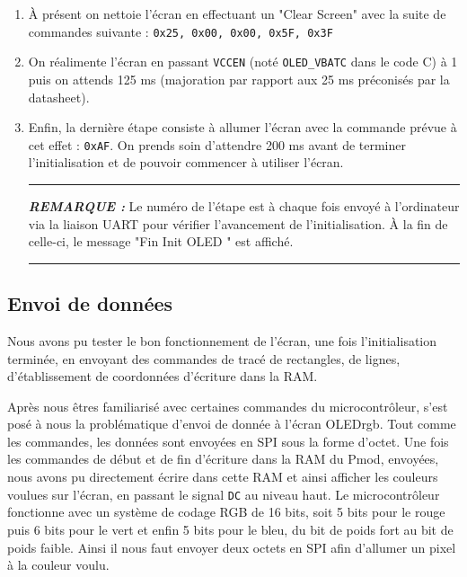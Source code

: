 \documentclass[11pt]{article}
\newcommand{\HRule}{\rule{\linewidth}{0.5mm}}
\newenvironment{rmq}[1] {\noindent\HRule\par\vspace{5pt}\textbf{\textit{REMARQUE : }}#1}{\\\HRule\par\vspace{5pt}}
\begin{document}
\begin{enumerate}
    \item À présent on nettoie l'écran en effectuant un "Clear Screen" avec la suite de commandes suivante : \texttt{0x25, 0x00, 0x00, 0x5F, 0x3F}

    \item On réalimente l'écran en passant \texttt{VCCEN} (noté \texttt{OLED\_VBATC} dans le code C) à 1 puis on attends 125 ms (majoration par rapport aux 25 ms préconisés par la datasheet). 

    \item Enfin, la dernière étape consiste à allumer l'écran avec la commande prévue à cet effet : \texttt{0xAF}. On prends soin d'attendre 200 ms avant de terminer l'initialisation et de pouvoir commencer à utiliser l'écran. 

    \begin{rmq}
    Le numéro de l'étape est à chaque fois envoyé à l'ordinateur via la liaison UART pour vérifier l'avancement de l'initialisation. À la fin de celle-ci, le message "Fin Init OLED " est affiché. 
    \end{rmq}


\end{enumerate}

\newpage

\subsection{Envoi de données}

Nous avons pu tester le bon fonctionnement de l'écran, une fois l'initialisation terminée, en envoyant des commandes de tracé de rectangles, de lignes, d'établissement de coordonnées d'écriture dans la RAM.

Après nous êtres familiarisé avec certaines commandes du microcontrôleur, s'est posé à nous la problématique d'envoi de donnée à l'écran OLEDrgb. Tout comme les commandes, les données sont envoyées en SPI sous la forme d'octet. Une fois les commandes de début et de fin d'écriture dans la RAM du Pmod, envoyées, nous avons pu directement écrire dans cette RAM et ainsi afficher les couleurs voulues sur l'écran, en passant le signal \texttt{DC} au niveau haut. Le microcontrôleur fonctionne avec un système de codage RGB de 16 bits, soit 5 bits pour le rouge puis 6 bits pour le vert et enfin 5 bits pour le bleu, du bit de poids fort au bit de poids faible. Ainsi il nous faut envoyer deux octets en SPI afin d'allumer un pixel à la couleur voulu. 
\end{document}
